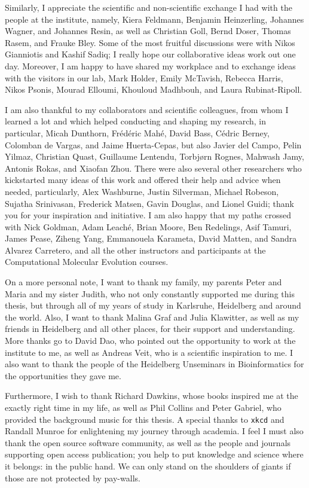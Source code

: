 Similarly, I appreciate the scientific and non-scientific exchange I had with the people at the institute, namely,
Kiera Feldmann, Benjamin Heinzerling, Johannes Wagner, and Johannes Resin,
as well as Christian Goll, Bernd Doser, Thomas Rasem, and Frauke Bley.
Some of the most fruitful discussions were with Nikos Gianniotis and Kashif Sadiq;
I really hope our collaborative ideas work out one day.
Moreover, I am happy to have shared my workplace and to exchange ideas with the visitors in our lab,
Mark Holder, Emily McTavish, Rebecca Harris, Nikos Psonis, Mourad Elloumi, Khouloud Madhbouh, and Laura Rubinat-Ripoll.

I am also thankful to my collaborators and scientific colleagues, from whom I learned a lot and which helped
conducting and shaping my research, in particular,
Micah Dunthorn, Fr\'{e}d\'{e}ric Mah\'{e}, David Bass, C\'{e}dric Berney, Colomban de Vargas, and Jaime Huerta-Cepas,
but also Javier del Campo, Pelin Yilmaz, Christian Quast, Guillaume Lentendu, Torbj\o{}rn Rognes, Mahwash Jamy,
Antonis Rokas, and Xiaofan Zhou.
There were also several other researchers who kickstarted many ideas of this work and offered their help and advice when needed,
particularly, Alex Washburne, Justin Silverman, Michael Robeson, Sujatha Srinivasan, Frederick Matsen,
Gavin Douglas, and Lionel Guidi; thank you for your inspiration and initiative.
I am also happy that my paths crossed with Nick Goldman, Adam Leach\'{e}, Brian Moore, Ben Redelings, Asif Tamuri,
James Pease, Ziheng Yang, Emmanouela Karameta, David Matten, and Sandra Alvarez Carretero,
and all the other instructors and participants at the Computational Molecular Evolution courses.

On a more personal note, I want to thank my family, my parents Peter and Maria and my sister Judith,
who not only constantly supported me during this thesis,
but through all of my years of study in Karlsruhe, Heidelberg and around the world.
Also, I want to thank Malina Graf and Julia Klawitter, as well as my friends in Heidelberg and all other places,
for their support and understanding.
More thanks go to David Dao, who pointed out the opportunity to work at the institute to me,
as well as Andreas Veit, who is a scientific inspiration to me.
I also want to thank the people of the Heidelberg Unseminars in Bioinformatics for the opportunities they gave me.

Furthermore, I wish to thank Richard Dawkins, whose books inspired me at the exactly right time in my life,
as well as Phil Collins and Peter Gabriel, who provided the background music for this thesis.
A special thanks to \texttt{xkcd} and Randall Munroe for enlightening my journey through academia.
I feel I must also thank the open source software community,
as well as the people and journals supporting open access publication;
you help to put knowledge and science where it belongs: in the public hand.
We can only stand on the shoulders of giants if those are not protected by pay-walls.

